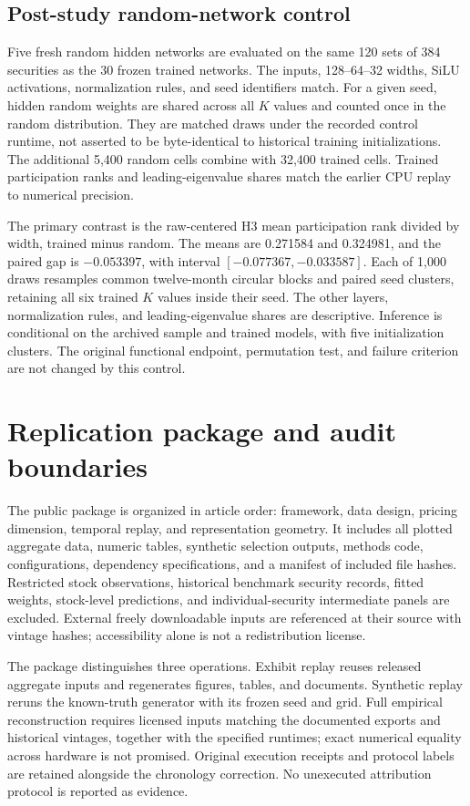 \documentclass[11pt]{article}
\begin{document}
\subsection{Post-study random-network control}
Five fresh random hidden networks are evaluated on the same 120 sets of 384 securities as the 30 frozen trained networks. The inputs, 128--64--32 widths, SiLU activations, normalization rules, and seed identifiers match. For a given seed, hidden random weights are shared across all $K$ values and counted once in the random distribution. They are matched draws under the recorded control runtime, not asserted to be byte-identical to historical training initializations. The additional 5,400 random cells combine with 32,400 trained cells. Trained participation ranks and leading-eigenvalue shares match the earlier CPU replay to numerical precision.

The primary contrast is the raw-centered H3 mean participation rank divided by width, trained minus random. The means are 0.271584 and 0.324981, and the paired gap is $-0.053397$, with interval $[-0.077367,-0.033587]$. Each of 1,000 draws resamples common twelve-month circular blocks and paired seed clusters, retaining all six trained $K$ values inside their seed. The other layers, normalization rules, and leading-eigenvalue shares are descriptive. Inference is conditional on the archived sample and trained models, with five initialization clusters. The original functional endpoint, permutation test, and failure criterion are not changed by this control.

\section{Replication package and audit boundaries}
The public package is organized in article order: framework, data design, pricing dimension, temporal replay, and representation geometry. It includes all plotted aggregate data, numeric tables, synthetic selection outputs, methods code, configurations, dependency specifications, and a manifest of included file hashes. Restricted stock observations, historical benchmark security records, fitted weights, stock-level predictions, and individual-security intermediate panels are excluded. External freely downloadable inputs are referenced at their source with vintage hashes; accessibility alone is not a redistribution license.

The package distinguishes three operations. Exhibit replay reuses released aggregate inputs and regenerates figures, tables, and documents. Synthetic replay reruns the known-truth generator with its frozen seed and grid. Full empirical reconstruction requires licensed inputs matching the documented exports and historical vintages, together with the specified runtimes; exact numerical equality across hardware is not promised. Original execution receipts and protocol labels are retained alongside the chronology correction. No unexecuted attribution protocol is reported as evidence.
\end{document}
